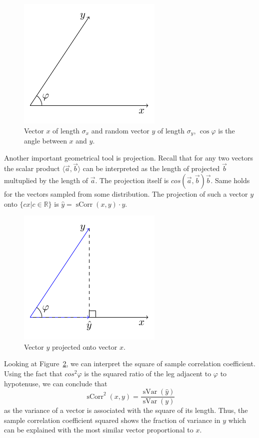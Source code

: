 \documentclass[nobib]{tufte-handout}
\DeclareMathOperator{\sVar}{sVar}
\DeclareMathOperator{\sCorr}{sCorr}
\begin{document}
\begin{figure}[h!]
\begin{center}
\includegraphics{images/corr_def.pdf}
\caption{Vector $x$ of length $\sigma_x$ and random vector $y$ of length $\sigma_y$, $\cos \varphi$ is the angle between $x$ and $y$.}
\label{fig:corr_def}
\end{center}
\end{figure}

Another important geometrical tool is projection. Recall that for any two vectors the scalar product $\langle \vec{a}, \vec{b} \rangle$ can be interpreted as the length of projected $\vec{b}$ multuplied by the length of $\vec{a}$.
The projection itself is $cos(\vec{a}, \vec{b}) \vec{b}$.
Same holds for the vectors sampled from some distribution.
The projection of such a vector $y$ onto $\{cx| c \in \mathbb{R}\}$ is $\hat y = \sCorr(x,y) \cdot y$.

\begin{figure}[h!]
\begin{center}
\includegraphics{images/corr_proj.pdf}
\caption{Vector $y$ projected onto vector $x$.}
\label{fig:corr_proj}
\end{center}
\end{figure}

Looking at Figure~\ref{fig:corr_proj}, we can interpret the square of sample correlation coefficient.
Using the fact that $cos^2 \varphi$ is the squared ratio of the leg adjacent to $\varphi$ to hypotenuse, we can conclude that
\[
\sCorr^2(x,y) = \frac{\sVar(\hat y)}{\sVar(y)}
\]
as the variance of a vector is associated with the square of its length.
Thus, the sample correlation coefficient squared shows the fraction of variance in $y$ which can be explained
with the most similar vector proportional to $x$.
\end{document}

